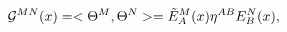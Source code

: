 \begin{equation}\label{GMN}
 {\cal G}^{MN}(x) = < \Theta^M , \Theta^N > = {\tilde E}^M_A(x)
 \eta^{AB} E^N_B(x),
\end{equation}

